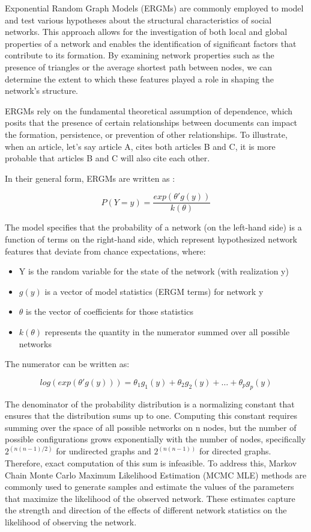 Exponential Random Graph Models (ERGMs) are commonly employed to model and test various hypotheses about the structural characteristics of social networks. This approach allows for the investigation of both local and global properties of a network and enables the identification of significant factors that contribute to its formation. By examining network properties such as the presence of triangles or the average shortest path between nodes, we can determine the extent to which these features played a role in shaping the network's structure.

ERGMs rely on the fundamental theoretical assumption of dependence, which posits that the presence of certain relationships between documents can impact the formation, persistence, or prevention of other relationships. To illustrate, when an article, let's say article A, cites both articles B and C, it is more probable that articles B and C will also cite each other.

In their general form, ERGMs are written as \citep{hunter2008}:

$$
P(Y=y) = \frac{exp(\theta' g(y))}{k(\theta)}
$$

The model specifies that the probability of a network (on the left-hand side) is 
a function of terms on the right-hand side, which represent hypothesized network features that 
deviate from chance expectations, where:

\begin{itemize}
    \item Y is the random variable for the state of the network (with realization y)
    \item $g(y)$ is a vector of model statistics (ERGM terms) for network y
    \item $\theta$ is the vector of coefficients for those statistics
    \item $k(\theta)$ represents the quantity in the numerator summed over all possible networks
\end{itemize}

The numerator can be written as:

$$
log(exp(\theta' g(y))) = \theta_1 g_1(y) + \theta_2 g_2(y) + \dots + \theta_p g_p(y)
$$

The denominator of the probability distribution is a normalizing constant that ensures that the distribution sums up to one. Computing this constant requires summing over the space of all possible networks on n nodes, but the number of possible configurations grows exponentially with the number of nodes, specifically $2^{(n(n-1)/2)}$ for undirected graphs and $2^{(n(n-1))}$ for directed graphs. Therefore, exact computation of this sum is infeasible. To address this, Markov Chain Monte Carlo Maximum Likelihood Estimation (MCMC MLE) methods are commonly used to generate samples and estimate the values of the parameters that maximize the likelihood of the observed network. These estimates capture the strength and direction of the effects of different network statistics on the likelihood of observing the network.

